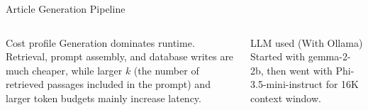 \documentclass[aspectratio=169,12pt]{beamer}
\begin{document}
\begin{frame}[t]{Article Generation Pipeline}
\begin{minipage}{1.07\textwidth}
\begin{columns}[T,totalwidth=\linewidth,onlytextwidth]
\vspace{0.04cm}
\begin{block}{Cost profile}
\scriptsize
Generation dominates runtime. Retrieval, prompt assembly, and database writes are much cheaper, while larger $k$ (the number of retrieved passages included in the prompt) and larger token budgets mainly increase latency.
\end{block}

\vspace{0.04cm}
\begin{block}{LLM used (With Ollama)}
\scriptsize
Started with gemma-2-2b, then went with Phi-3.5-mini-instruct for 16K context window.
\end{block}
\end{columns}
\end{minipage}
\end{frame}

\end{document}
